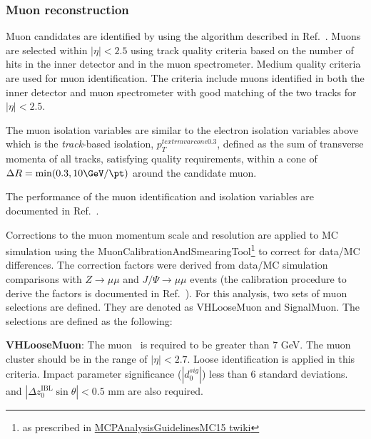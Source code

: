 \subsubsection{Muon reconstruction}
\label{sec:mu_reco}
Muon candidates are identified by using the algorithm described in
Ref.~\cite{Muons2015}. Muons are selected within $|\eta| < 2.5$
using track quality criteria based on the number of hits in the
inner detector and in the muon spectrometer. Medium quality criteria 
are used for muon identification. The criteria include muons
identified in both the inner detector and muon spectrometer with
good matching of the two tracks for $|\eta| < 2.5$.

The muon isolation variables are similar to the electron isolation variables above 
which is the \textit{track}-based isolation, ${p_{T}^{textrm{varcone0.3}}}$, defined as the 
sum of transverse momenta of all tracks, satisfying quality requirements, 
within a cone of $\Delta R = \mathrm{min}(0.3,10 \GeV/\pt)$
around the candidate muon.


The performance of the muon identification and isolation variables are documented in Ref.~\cite{Aad:2016jkr}.

Corrections to the muon momentum scale and resolution are applied to MC simulation using the MuonCalibrationAndSmearingTool\footnote{as prescribed 
in \href{https://twiki.cern.ch/twiki/bin/view/AtlasProtected/MCPAnalysisGuidelinesMC15\#Muon_momentum_scale_and_resoluti} {MCPAnalysisGuidelinesMC15 twiki}} 
to correct for  data/MC differences. The correction factors were derived from data/MC 
simulation comparisons with $Z\to \mu \mu$ and $J/\Psi \to \mu \mu$ events (the calibration procedure to derive the factors 
is documented in Ref.~\cite{Aad:2016jkr}).
For this analysis, two sets of muon selections are defined. They are denoted as VHLooseMuon and SignalMuon.
The selections are defined as the following:

\textbf{VHLooseMuon}: The muon \pt~is required to be greater than 7 GeV. 
The muon cluster should be in the range of $|\eta|< 2.7$. 
Loose identification is applied in this criteria. 
Impact parameter significance ($|d_{0}^{sig}|$) less than 6 standard deviations. 
and $|\Delta{z_{0}^{\textrm{IBL}}}\sin\theta| < 0.5$ mm are also required. 

